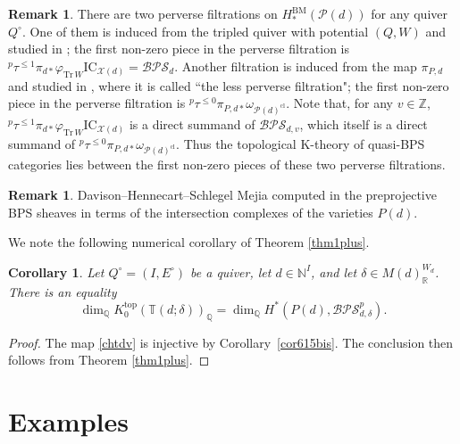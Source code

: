 \documentclass [11pt,oneside,a4paper,mathscr]{amsart}
\newtheorem{cor}[thm]{Corollary}
\theoremstyle{definition}
\newtheorem{remark}[thm]{Remark}
\renewcommand{\leq}{\leqslant}
\newcommand{\X}{\mathscr{X}}
\begin{document}
\begin{remark}
    There are two perverse filtrations on $H^{\mathrm{BM}}_{\ast}(\mathscr{P}(d))$ for any quiver $Q^\circ$. One of them is induced from the tripled quiver with potential $(Q,W)$ and studied in \cite{DM}; the first non-zero piece in the perverse filtration is ${}^p\tau^{\leq 1}\pi_{d*}\varphi_{\mathrm{Tr}\,W}\mathrm{IC}_{\X(d)}=\mathcal{BPS}_d$. 
    Another filtration is induced from the map $\pi_{P,d}$ and studied in \cite{D}, where it is called ``the less perverse filtration"; the first non-zero piece in the perverse filtration is ${}^p\tau^{\leq 0}\pi_{P,d*}\omega_{\mathscr{P}(d)^{\mathrm{cl}}}$.
    Note that, for any $v\in\mathbb{Z}$, 
    ${}^p\tau^{\leq 1}\pi_{d*}\varphi_{\mathrm{Tr}\,W}\mathrm{IC}_{\X(d)}$ is a direct summand of 
    $\mathcal{BPS}_{d,v}$, which itself is a direct summand of  ${}^p\tau^{\leq 0}\pi_{P,d*}\omega_{\mathscr{P}(d)^{\mathrm{cl}}}$. Thus the topological K-theory of quasi-BPS categories lies between the first non-zero pieces of these two perverse filtrations. 
\end{remark}






\begin{remark}
     Davison--Hennecart--Schlegel Mejia computed in \cite{DHSM, DHSM2} the preprojective BPS sheaves in terms of the intersection complexes of the varieties $P(d)$. 
\end{remark}

We note the following numerical corollary of Theorem \ref{thm1plus}.

\begin{cor}\label{corollarythm1plus}
    Let $Q^\circ=(I, E^{\circ})$ be a quiver, let $d \in \mathbb{N}^{I}$, and let $\delta\in M(d)_\mathbb{R}^{W_d}$. 
    There is an equality 
    \[\dim_\mathbb{Q} K^{\mathrm{top}}_0(\mathbb{T}(d; \delta))_{\mathbb{Q}}=\dim_\mathbb{Q} H^{\ast}(P(d), \mathcal{BPS}^p_{d, \delta}).\]
\end{cor}

\begin{proof}
The map \eqref{chtdv} is injective by Corollary~\ref{cor615bis}.
The conclusion then follows from Theorem \ref{thm1plus}. 
\end{proof}

\section{Examples}\label{s8}
\end{document}
